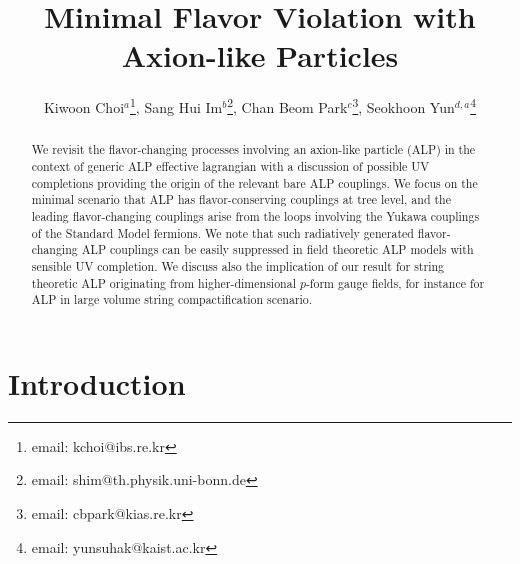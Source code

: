 \documentclass[preprint,prd,aps,tighten,nofootinbib,amssymb]{revtex4}
\begin{document}
\draft
\tighten
{}

\title{\large \bf Minimal Flavor Violation with Axion-like Particles}

\author{
    Kiwoon Choi$^{a}$\footnote{email: kchoi@ibs.re.kr},
    Sang Hui Im$^{b}$\footnote{email: shim@th.physik.uni-bonn.de},
    Chan Beom Park$^{c}$\footnote{email: cbpark@kias.re.kr},
    Seokhoon Yun$^{d, a}$\footnote{email: yunsuhak@kaist.ac.kr}}
     

\vspace{4cm}

\begin{abstract}

We revisit the flavor-changing processes involving  an axion-like particle (ALP) in the context of generic ALP effective lagrangian with a discussion of possible UV completions providing the origin of the relevant bare ALP couplings.  
We focus on the minimal scenario that ALP has flavor-conserving couplings at tree level, and the leading flavor-changing couplings  arise  from the loops involving the Yukawa couplings of the Standard Model fermions.
We note that such radiatively generated flavor-changing ALP couplings can be easily suppressed in field theoretic ALP models with sensible UV completion.
We discuss also the implication of our result for string theoretic ALP  originating from higher-dimensional $p$-form gauge fields, for instance for ALP in large volume string compactification scenario.

\end{abstract}

\pacs{}
\maketitle

\section{Introduction} 
\end{document}
